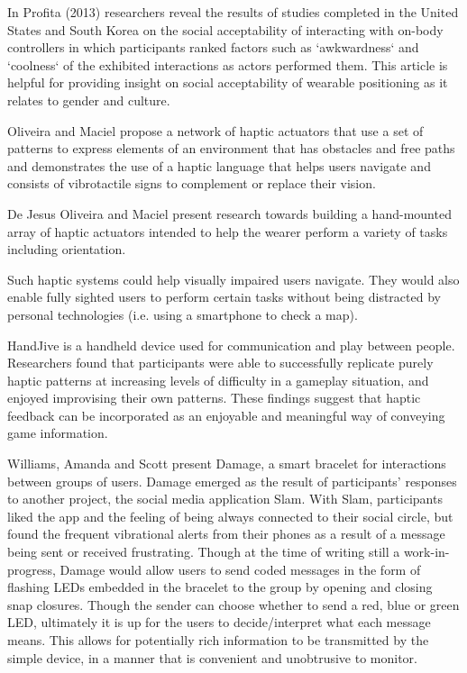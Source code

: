 \documentclass{chi-ext}
\begin{document}
In Profita (2013) \cite{profita2013don} researchers reveal the results of studies completed in the United States and South Korea on the social acceptability of interacting with on-body controllers in which participants  ranked factors such as `awkwardness` and `coolness` of the exhibited interactions as actors performed them. This article is helpful for providing insight on social acceptability of wearable positioning as it relates to gender and culture.

Oliveira and Maciel propose a network of haptic actuators that use a set of patterns to express elements of an environment that has obstacles and free paths and demonstrates the use of a haptic language that helps users navigate and consists of vibrotactile signs to complement or replace their vision. \cite{Jesus-Oliveira:2013aa}

De Jesus Oliveira and Maciel \cite{Jesus-Oliveira:2013aa} present research towards building a hand-mounted array of haptic actuators intended to help the wearer perform a variety of tasks including orientation. 


Such haptic systems could help visually impaired users navigate. They would also enable fully sighted users to perform certain tasks without being distracted by personal technologies (i.e. using a smartphone to check a map).

\cite{fogg1998handjive}HandJive is a handheld device used for communication and play between people. Researchers found that participants were able to successfully replicate purely haptic patterns at increasing levels of difficulty in a gameplay situation, and enjoyed improvising their own patterns. These findings suggest that haptic feedback can be incorporated as an enjoyable and meaningful way of conveying game information.

\cite{williams2006exploring}Williams, Amanda and Scott present Damage, a smart bracelet for interactions between groups of users. Damage emerged as the result of participants' responses to another project, the social media application Slam. With Slam, participants liked the app and the feeling of being always connected to their social circle, but found the frequent vibrational alerts from their phones as a result of a message being sent or received frustrating. Though at the time of writing still a work-in-progress, Damage would allow users to send coded messages in the form of flashing LEDs embedded in the bracelet to the group by opening and closing snap closures. Though the sender can choose whether to send a red, blue or green LED, ultimately it is up for the users to decide/interpret what each message means. This allows for potentially rich information to be transmitted by the simple device, in a manner that is convenient and unobtrusive to monitor.
\end{document}
